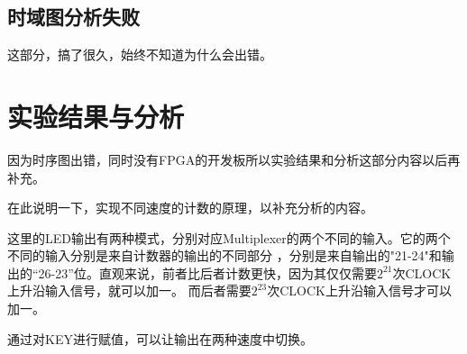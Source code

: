 \documentclass{zjureport}
\begin{document}
  \subsection{时域图分析失败}
  这部分，搞了很久，始终不知道为什么会出错。
\section{实验结果与分析}
因为时序图出错，同时没有FPGA的开发板所以实验结果和分析这部分内容以后再补充。

在此说明一下，实现不同速度的计数的原理，以补充分析的内容。

这里的LED输出有两种模式，分别对应Multiplexer的两个不同的输入。它的两个不同的输入分别是来自计数器的输出的不同部分
，分别是来自输出的"21-24"和输出的“26-23”位。直观来说，前者比后者计数更快，因为其仅仅需要$2^{21} $次CLOCK上升沿输入信号，就可以加一。
而后者需要$2^{23}$次CLOCK上升沿输入信号才可以加一。

通过对KEY进行赋值，可以让输出在两种速度中切换。
\end{document}
